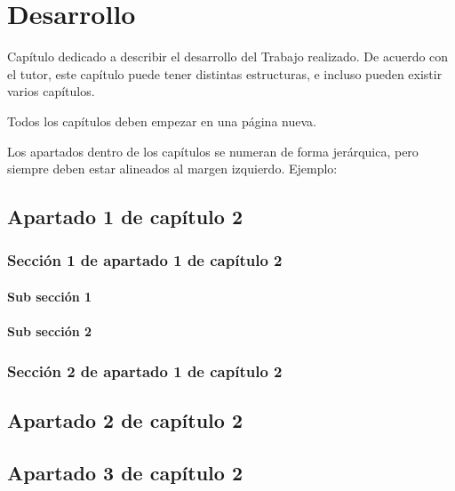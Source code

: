 \chapter{Desarrollo}
Capítulo dedicado a describir el desarrollo del Trabajo realizado. De acuerdo con el tutor, este capítulo puede tener distintas estructuras, e incluso pueden existir varios capítulos.

Todos los capítulos deben empezar en una página nueva.

Los apartados dentro de los capítulos se numeran de forma jerárquica, pero siempre deben estar alineados al margen izquierdo. Ejemplo:

\section{Apartado 1 de capítulo 2}

\subsection{Sección 1 de apartado 1 de capítulo 2}

\subsubsection{Sub sección 1}

\subsubsection{Sub sección 2}

\subsection{Sección 2 de apartado 1 de capítulo 2}

\section{Apartado 2 de capítulo 2}

\section{Apartado 3 de capítulo 2}
